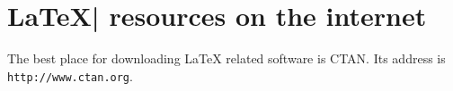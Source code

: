 \documentclass{article}
\begin{document}
\section{\textsf{\LaTeX| resources on the internet}}
The best place for downloading LaTeX related software is CTAN. Its address is \texttt{http://www.ctan.org}.
\end{document}
